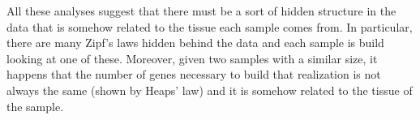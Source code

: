 \FloatBarrier
All these analyses suggest that there must be a sort of hidden structure in the data that is somehow related to the tissue each sample comes from. In particular, there are many Zipf's laws hidden behind the data and each sample is build looking at one of these. Moreover, given two samples with a similar size, it happens that the number of genes necessary to build that realization is not always the same (shown by Heaps' law) and it is somehow related to the tissue of the sample.